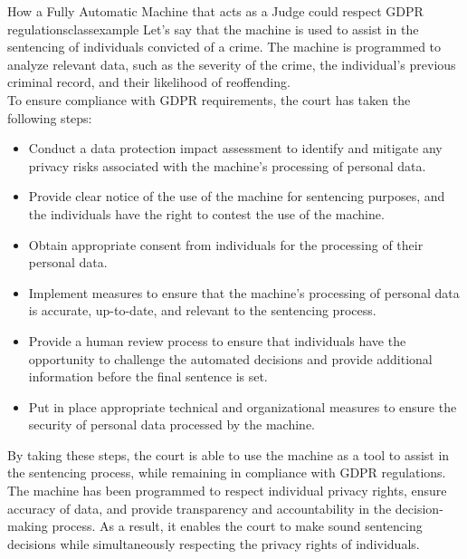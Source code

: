 \documentclass{article}
\begin{document}
\begin{class}{How a Fully Automatic Machine that acts as a Judge could respect GDPR regulations}{classexample}
  Let’s say that the machine is used to assist in the sentencing of individuals convicted of a crime. 
  The machine is programmed to analyze relevant data, such as the severity of the crime, the individual’s previous 
  criminal record, and their likelihood of reoffending. \\

  To ensure compliance with GDPR requirements, the court has taken the following steps:
  \begin{itemize}
    \item Conduct a data protection impact assessment to identify and mitigate any privacy risks associated with the machine’s processing of personal data.
    \item Provide clear notice of the use of the machine for sentencing purposes, and the individuals have the right to contest the use of the machine.
    \item Obtain appropriate consent from individuals for the processing of their personal data.
    \item Implement measures to ensure that the machine’s processing of personal data is accurate, up-to-date, and relevant to the sentencing process.
    \item Provide a human review process to ensure that individuals have the opportunity to challenge the automated decisions and provide additional information before the final sentence is set.
    \item Put in place appropriate technical and organizational measures to ensure the security of personal data processed by the machine.
  \end{itemize}
\end{class} 

By taking these steps, the court is able to use the machine as a tool to assist in the sentencing process, 
while remaining in compliance with GDPR regulations. The machine has been programmed to respect individual 
privacy rights, ensure accuracy of data, and provide transparency and accountability in the decision-making process. 
As a result, it enables the court to make sound sentencing decisions while simultaneously respecting the privacy rights
of individuals.
\end{document}
